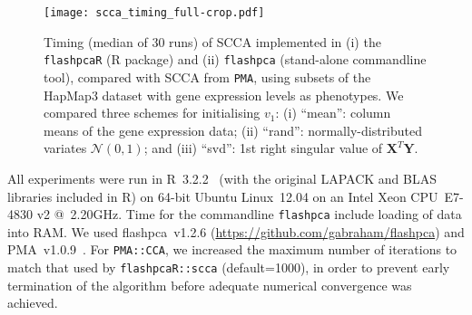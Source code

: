 \documentclass[a4paper,12pt]{article}
\begin{document}
\begin{figure}[!tpb]
\centering
\texttt{[image: scca\_timing\_full-crop.pdf]}
\caption{
Timing (median of 30 runs) of SCCA implemented in (i) the \texttt{flashpcaR}
(\textsf{R} package) and (ii) \texttt{flashpca} (stand-alone commandline tool),
compared with SCCA from \texttt{PMA}, using subsets of the HapMap3 dataset with gene
expression levels as phenotypes. We compared three schemes for initialising
$v_1$: (i) ``mean'': column means of the gene expression data; (ii) ``rand'':
normally-distributed variates $\mathcal{N}(0, 1)$; and (iii) ``svd'': 1st
right singular value of $\mathbf{X}^T \mathbf{Y}$.
}
\label{fig:s01}
\end{figure}

All experiments were run in \textsf{R}~3.2.2~\citep{R} (with the original
LAPACK and BLAS libraries included in \textsf{R}) on 64-bit Ubuntu Linux~12.04
on an Intel Xeon CPU~E7-4830 v2 @~2.20GHz. Time for the commandline
\texttt{flashpca} include loading of data into RAM. We used flashpca~v1.2.6
(\url{https://github.com/gabraham/flashpca}) and PMA~v1.0.9~\citep{Witten2013}.
For \texttt{PMA::CCA}, we increased the maximum number of iterations to match
that used by \texttt{flashpcaR::scca} (default=1000), in order to prevent
early termination of the algorithm before adequate numerical convergence was
achieved. 



\end{document}
